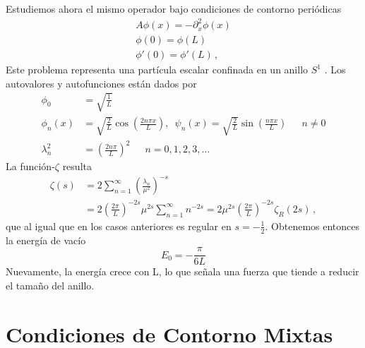 Estudiemos ahora el mismo operador bajo condiciones de contorno periódicas
\begin{equation}
\begin{array}{c}
	A \phi (x) = - \partial _x ^2 \phi (x) \\[5pt]
    \phi (0) = \phi (L)  \\[5pt]
    \phi ' (0) = \phi ' (L) \, ,
\end{array}
\end{equation}
Este problema representa una partícula escalar confinada en un anillo $S ^1$ .
Los autovalores y autofunciones están dados por
\begin{align}
\nonumber
	\phi _{0} &= \sqrt{\frac{1}{L}} 
\\[5pt]
\nonumber
	\phi _{n} (x) &= \sqrt{\frac{2}{L}} \cos \left( \frac{2 n \pi x}{L} 
	\right),
	\, \, \,  \psi _n (x) =\sqrt{\frac{2}{L}} \sin \left( \frac{n \pi 		x}{L} \right) 
	\, \, \, \, \, \, \, \, \, n \neq 0
	\\[5pt]
	\lambda ^2 _n  &= \left( \frac{2 n \pi }{L} \right) ^2 
	\, \, \, \, \, \, \, \, \,
	 n = 0,1,2,3, \dots
\end{align}
La función-$\zeta$ resulta
\begin{align}
\nonumber
	\zeta  (s) &= 
	2 \sum _{n=1} ^{\infty} \left( \frac{\lambda _n}{\mu ^2} \right)^
	{-s} 
	\\[5pt]
&=  2 \left( \frac{2 \pi}{L} \right) ^{-2s} \mu ^{2s} \sum _{n=1} ^{\infty} n ^{-2s} =  
2 \mu ^{2s} \left( \frac{2 \pi}{L} \right) ^{-2s} \zeta _R (2s)
\, ,
\end{align}
que al igual que en los casos anteriores es regular en $s=- \frac{1}{2}$. Obtenemos
entonces la energía de vacío
\begin{equation}
E _0 = - \frac{\pi}{6 L}
\end{equation}
Nuevamente, la energía crece con L, lo que señala una fuerza que tiende a
reducir el tamaño del anillo.

\section{Condiciones de Contorno Mixtas}


